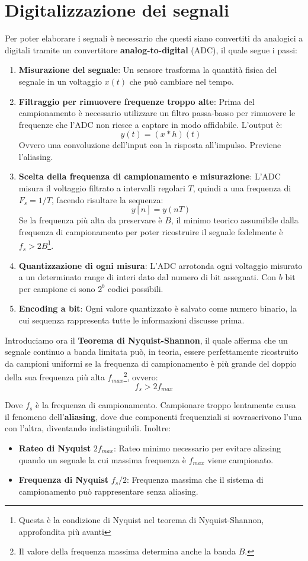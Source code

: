 \section{Digitalizzazione dei segnali}
Per poter elaborare i segnali è necessario che questi siano convertiti da analogici a digitali tramite un convertitore \textbf{analog-to-digital} (ADC),
il quale segue i passi: \begin{enumerate}
	\item \textbf{Misurazione del segnale}: Un sensore trasforma la quantità fisica del segnale in un voltaggio $x(t)$ che può cambiare nel tempo.
	\item \textbf{Filtraggio per rimuovere frequenze troppo alte}: Prima del campionamento è necessario utilizzare un filtro passa-basso per rimuovere
        le frequenze che l'ADC non riesce a captare in modo affidabile. L'output è: \[
			y(t) = (x*h)(t)
	    \]
	\noindent Ovvero una convoluzione dell'input con la risposta all'impulso. Previene l'aliasing.
	\item \textbf{Scelta della frequenza di campionamento e misurazione}: L'ADC misura il voltaggio filtrato a intervalli regolari $T$, quindi a una
        frequenza di $F_s = 1/T$, facendo risultare la sequenza: \[
		    y[n] = y(nT)
	    \]
	\noindent Se la frequenza più alta da preservare è $B$, il minimo teorico assumibile dalla frequenza di campionamento per poter ricostruire il
        segnale fedelmente è $f_s > 2B$\footnote{Questa è la condizione di Nyquist nel teorema di Nyquist-Shannon, approfondita più avanti}.
	\item \textbf{Quantizzazione di ogni misura}: L'ADC arrotonda ogni voltaggio misurato a un determinato range di interi dato dal numero di bit
        assegnati. Con $b$ bit per campione ci sono $2^b$ codici possibili.
	\item \textbf{Encoding a bit}: Ogni valore quantizzato è salvato come numero binario, la cui sequenza rappresenta tutte le informazioni discusse
        prima.
\end{enumerate}

\noindent Introduciamo ora il \textbf{Teorema di Nyquist-Shannon}, il quale afferma che un segnale continuo a banda limitata può, in teoria, essere
perfettamente ricostruito da campioni uniformi se la frequenza di campionamento è più grande del doppio della sua frequenza più alta $f_{max}$\footnote{
Il valore della frequenza massima determina anche la banda $B$.}, ovvero: \[
	f_s > 2f_{max}
\]

\noindent Dove $f_s$ è la frequenza di campionamento. Campionare troppo lentamente causa il fenomeno dell'\textbf{aliasing}, dove due componenti
frequenziali si sovrascrivono l'una con l'altra, diventando indistinguibili. Inoltre: \begin{itemize}
	\item \textbf{Rateo di Nyquist} $2f_{max}$: Rateo minimo necessario per evitare aliasing quando un segnale la cui massima frequenza è $f_{max}$
        viene campionato.
	\item \textbf{Frequenza di Nyquist} $f_s/2$: Frequenza massima che il sistema di campionamento può rappresentare senza aliasing.
\end{itemize}

